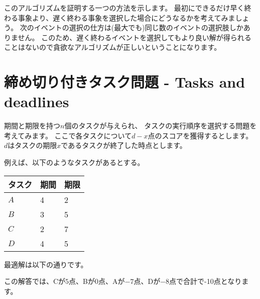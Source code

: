 このアルゴリズムを証明する一つの方法を示します。
最初にできるだけ早く終わる事象より、遅く終わる事象を選択した場合にどうなるかを考えてみましょう。
次のイベントの選択の仕方は(最大でも)同じ数のイベントの選択肢しかありません。
このため、遅く終わるイベントを選択してもより良い解が得られることはないので貪欲なアルゴリズムが正しいということになります。

\section{締め切り付きタスク問題 - Tasks and deadlines}

期間と期限を持つ$n$個のタスクが与えられ、
タスクの実行順序を選択する問題を考えてみます。
ここで各タスクについて$d - x$点のスコアを獲得するとします。
$d$はタスクの期限$x$であるタスクが終了した時点とします。

例えば、以下のようなタスクがあるとする。
\begin{center}
\begin{tabular}{lll}
タスク & 期間 & 期限 \\
\hline
$A$ & 4 & 2 \\
$B$ & 3 & 5 \\
$C$ & 2 & 7 \\
$D$ & 4 & 5 \\
\end{tabular}
\end{center}

最適解は以下の通りです。

\begin{center}
\end{center}

この解答では、Cが$5$点、Bが$0$点、Aが$-7$点、Dが$-8$点で合計で-10点となります。

